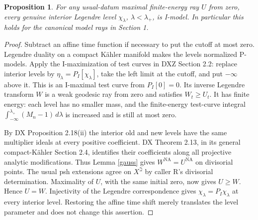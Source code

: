 \documentclass[11pt]{article}
\newtheorem{proposition}[theorem]{Proposition}
\newcommand{\NA}{\mathrm{NA}}
\begin{document}
\begin{proposition}\label{maxI}
For any usual-datum maximal finite-energy ray $U$ from zero, every
genuine interior Legendre level $\chi_\lambda$, $\lambda<\lambda_+$,
is I-model. In particular this holds for the canonical model rays
in Section 1.
\end{proposition}
\begin{proof}
Subtract an affine time function if necessary to put the cutoff at
most zero. Legendre duality on a compact K\"ahler manifold makes
the levels normalized P-models. Apply the I-maximization of test
curves in DXZ Section 2.2: replace interior levels by
$\eta_\lambda=P_I[\chi_\lambda]$, take the left limit at the cutoff,
and put $-\infty$ above it. This is an I-maximal test curve from
$P_I[0]=0$. Its inverse Legendre transform $W$ is a weak geodesic
ray from zero and satisfies $W_t\ge U_t$. It has finite energy:
each level has no smaller mass, and the finite-energy test-curve
integral $\int_{-\infty}^{\lambda_+}(M_n-1)\,d\lambda$ is
increased and is still at most zero.

By DX Proposition 2.18(ii) the interior old and new levels have the
same multiplier ideals at every positive coefficient. DX Theorem
2.13, in its general compact-K\"ahler Section 2.4, identifies their
coefficients along all projective analytic modifications. Thus
Lemma \ref{gauss} gives $W^\NA=U^\NA$ on divisorial points. The
usual psh extensions agree on $X^\beth$ by caller R's divisorial
determination. Maximality of $U$, with the same initial zero, now
gives $U\ge W$. Hence $U=W$. Injectivity of the Legendre
correspondence gives $\chi_\lambda=P_I\chi_\lambda$ at every
interior level. Restoring the affine time shift merely translates
the level parameter and does not change this assertion.
\end{proof}
\end{document}
